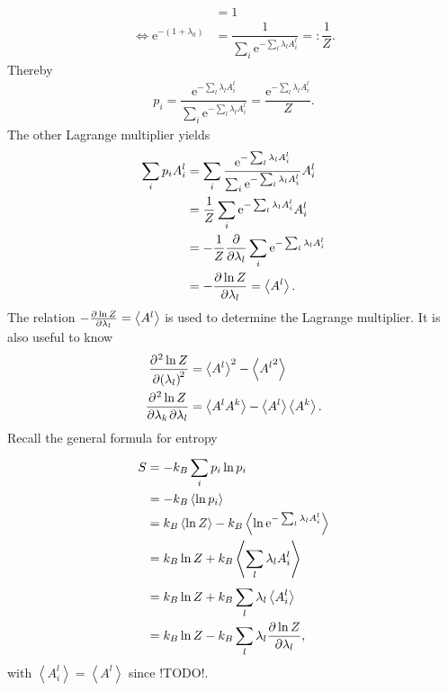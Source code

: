 \documentclass[a4paper,10pt]{article}
\numberwithin{equation}{section}
\begin{document}
\begin{multicols}{2}
\begin{align}
                 &= 1\\
  \Leftrightarrow \text{e}^{-(1+\lambda _0)} &= \dfrac{1}{\sum_{i}^{}\text{e}^{-\sum_{l}^{}\lambda _lA_i^l}}=:\dfrac{1}{Z}
.\end{align} 
Thereby
\begin{align} 
  p_i=\dfrac{\text{e}^{-\sum_{l}^{}\lambda _lA_i^l}}{\sum_{i}^{}\text{e}^{-\sum_{l}^{}\lambda _lA_i^l}}=\dfrac{\text{e}^{-\sum_{l}^{}\lambda _lA_i^l}}{Z}
.\end{align} 
The other Lagrange multiplier yields
\begin{align} 
  \sum_{i}^{}p_iA_i^l &= \sum_{i}^{}\dfrac{\text{e}^{-\sum_{l}^{}\lambda _lA_i^l}}{\sum_{i}^{}\text{e}^{-\sum_{l}^{}\lambda _lA_i^l}}A_i^l\\
                      &= \dfrac{1}{Z}\sum_{i}^{}\text{e}^{-\sum_{l}^{}\lambda _lA_i^l}A_i^l\\
                      &= -\dfrac{1}{Z}\diffp*[]{\sum_{i}^{}\text{e}^{-\sum_{l}^{}\lambda _lA_i^l}}{\lambda _l}\\
                      &= -\diffp[]{\ln Z}{\lambda _l} = \left\langle A^l\right\rangle 
.\end{align} 
The relation $-\diffp[]{\ln Z}{\lambda _l} = \left\langle A^l\right\rangle $ is used to determine the Lagrange multiplier.
It is also useful to know
\begin{align} 
  \diffp[2]{\ln Z}{\lambda _l} &= \left\langle A^l\right\rangle ^2-\left\langle {A^l}^2\right\rangle \\
  \diffp[]{\ln Z}{\lambda _k,\lambda _l} &= \left\langle A^lA^k\right\rangle -\left\langle A^l\right\rangle \left\langle A^k\right\rangle 
.\end{align}
Recall the general formula for entropy
\begin{align} 
  S &= -k_B\sum_{i}^{}p_i\ln p_i\\
    &= -k_B\left\langle \ln p_i\right\rangle \\
    &= k_B\left\langle \ln Z\right\rangle -k_B\left\langle \ln \text{e}^{-\sum_{l}^{}\lambda _lA^l_i}\right\rangle \\
    &= k_B\ln Z + k_B\left\langle \sum_{l}^{}\lambda _lA_i^l\right\rangle \\
    &= k_B\ln Z + k_B\sum_{l}^{}\lambda _l\left\langle A_i^l\right\rangle \\
    &= k_B\ln Z - k_B\sum_{l}^{}\lambda _l\diffp[]{\ln Z}{\lambda _l}
,\end{align} 
with $\left\langle A_i^l\right\rangle =\left\langle A^l\right\rangle $ since !TODO!.


\end{multicols}
\end{document}
